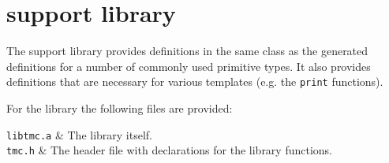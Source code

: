 \section{{\C} support library}
\label{s.csupportlib}
The {\C} support library provides definitions in
the same class as the generated definitions for a number of commonly used
primitive types.
It also provides definitions that are necessary
for various templates (e.g. the {\tt print} functions).
\par
For the library the following files are provided:

\begin{desctab}
{\tt libtmc.a} & The library itself. \\
{\tt tmc.h} & The header file with declarations for the library functions. \\
\end{desctab}
